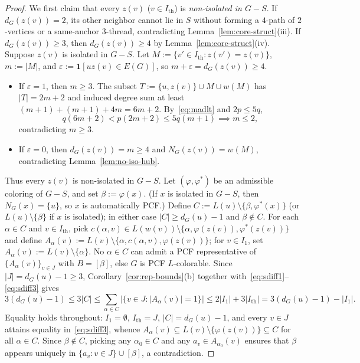 \documentclass[11pt,a4paper]{article}
\theoremstyle{definition}
\begin{document}
\begin{proof}
We first claim that every $z(v)$ ($v \in I_{\mathrm{th}}$) is \emph{non-isolated in $G - S$}. If $d_G(z(v)) = 2$, its other neighbor cannot lie in $S$ without forming a $4$-path of $2$-vertices or a same-anchor $3$-thread, contradicting Lemma~\ref{lem:core-struct}(iii). If $d_G(z(v)) \ge 3$, then $d_G(z(v)) \ge 4$ by Lemma~\ref{lem:core-struct}(iv). Suppose $z(v)$ is isolated in $G - S$. Let $M := \{v' \in I_{\mathrm{th}} : z(v') = z(v)\}$, $m := |M|$, and $\varepsilon := \mathbf{1}[uz(v) \in E(G)]$, so $m + \varepsilon = d_G(z(v)) \ge 4$.
\begin{itemize}[leftmargin=*,itemsep=1pt]
  \item If $\varepsilon = 1$, then $m \ge 3$. The subset $T := \{u, z(v)\} \cup M \cup w(M)$ has $|T| = 2m + 2$ and induced degree sum at least $(m+1) + (m+1) + 4m = 6m + 2$. By~\eqref{eq:madlt} and $2p \le 5q$,
  \[
    q(6m + 2) < p(2m + 2) \le 5q(m + 1) \implies m \le 2,
  \]
  contradicting $m \ge 3$.
  \item If $\varepsilon = 0$, then $d_G(z(v)) = m \ge 4$ and $N_G(z(v)) = w(M)$, contradicting Lemma~\ref{lem:no-iso-hub}.
\end{itemize}
Thus every $z(v)$ is non-isolated in $G - S$. Let $(\varphi, \varphi^*)$ be an admissible coloring of $G - S$, and set $\beta := \varphi(x)$. (If $x$ is isolated in $G - S$, then $N_G(x) = \{u\}$, so $x$ is automatically PCF.) Define $C := L(u) \setminus \{\beta, \varphi^*(x)\}$ (or $L(u) \setminus \{\beta\}$ if $x$ is isolated); in either case $|C| \ge d_G(u) - 1$ and $\beta \notin C$. For each $\alpha \in C$ and $v \in I_{\mathrm{th}}$, pick $c(\alpha, v) \in L(w(v)) \setminus \{\alpha, \varphi(z(v)), \varphi^*(z(v))\}$ and define $A_\alpha(v) := L(v) \setminus \{\alpha, c(\alpha, v), \varphi(z(v))\}$; for $v \in I_1$, set $A_\alpha(v) := L(v) \setminus \{\alpha\}$. No $\alpha \in C$ can admit a PCF representative of $\{A_\alpha(v)\}_{v \in J}$ with $B = [\beta]$, else $G$ is PCF $L$-colorable. Since $|J| = d_G(u) - 1 \ge 3$, Corollary~\ref{cor:rep-bounds}(b) together with~\eqref{eq:sdiff1}--\eqref{eq:sdiff3} gives
\[
  3(d_G(u) - 1) \le 3|C| \le \sum_{\alpha \in C} \bigl|\{v \in J : |A_\alpha(v)| = 1\}\bigr| \le 2|I_1| + 3|I_{\mathrm{th}}| = 3(d_G(u) - 1) - |I_1|.
\]
Equality holds throughout: $I_1 = \emptyset$, $I_{\mathrm{th}} = J$, $|C| = d_G(u) - 1$, and every $v \in J$ attains equality in~\eqref{eq:sdiff3}, whence $A_\alpha(v) \subseteq L(v) \setminus \{\varphi(z(v))\} \subseteq C$ for all $\alpha \in C$. Since $\beta \notin C$, picking any $\alpha_0 \in C$ and any $a_v \in A_{\alpha_0}(v)$ ensures that $\beta$ appears uniquely in $\{a_v : v \in J\} \cup [\beta]$, a contradiction.
\end{proof}
\end{document}
